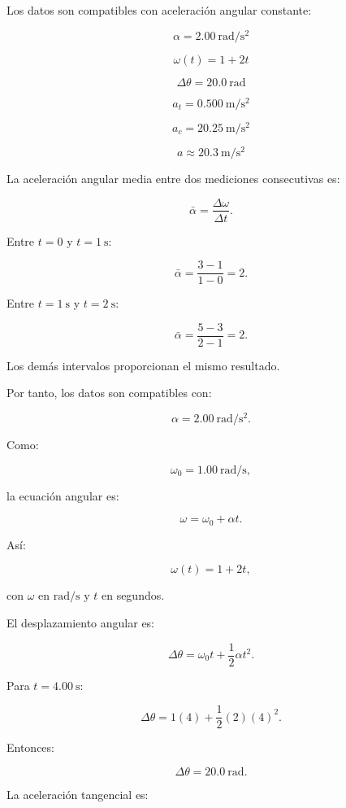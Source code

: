 \begin{respuesta}
Los datos son compatibles con aceleración angular constante:

\[
\boxed{\alpha=\SI{2.00}{\radian\per\second\squared}}
\]

\[
\boxed{\omega(t)=1+2t}
\]

\[
\boxed{\Delta\theta=\SI{20.0}{\radian}}
\]

\[
\boxed{a_t=\SI{0.500}{\meter\per\second\squared}}
\]

\[
\boxed{a_c=\SI{20.25}{\meter\per\second\squared}}
\]

\[
\boxed{a\approx\SI{20.3}{\meter\per\second\squared}}
\]
\end{respuesta}

\begin{explicacion}
La aceleración angular media entre dos mediciones consecutivas es:

\[
\bar{\alpha}=\frac{\Delta\omega}{\Delta t}.
\]

Entre \(t=0\) y \(t=\SI{1}{\second}\):

\[
\bar{\alpha}=\frac{3-1}{1-0}=2.
\]

Entre \(t=\SI{1}{\second}\) y \(t=\SI{2}{\second}\):

\[
\bar{\alpha}=\frac{5-3}{2-1}=2.
\]

Los demás intervalos proporcionan el mismo resultado.

Por tanto, los datos son compatibles con:

\[
\boxed{\alpha=\SI{2.00}{\radian\per\second\squared}}.
\]

Como:

\[
\omega_0=\SI{1.00}{\radian\per\second},
\]

la ecuación angular es:

\[
\omega=\omega_0+\alpha t.
\]

Así:

\[
\boxed{\omega(t)=1+2t},
\]

con \(\omega\) en \(\si{\radian\per\second}\)
y \(t\) en segundos.

El desplazamiento angular es:

\[
\Delta\theta=\omega_0t+\frac12\alpha t^2.
\]

Para \(t=\SI{4.00}{\second}\):

\[
\Delta\theta=1(4)+\frac12(2)(4)^2.
\]

Entonces:

\[
\boxed{\Delta\theta=\SI{20.0}{\radian}}.
\]

La aceleración tangencial es:


\end{explicacion}
